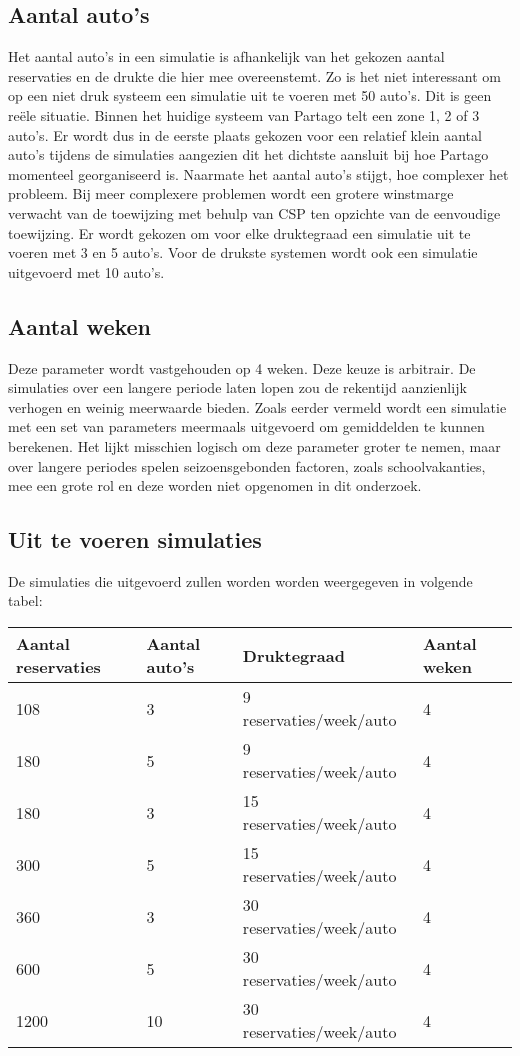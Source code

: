 \subsection{Aantal auto's}
Het aantal auto's in een simulatie is afhankelijk van het gekozen aantal reservaties en de drukte die hier mee overeenstemt. Zo is het niet interessant om op een niet druk systeem een simulatie uit te voeren met 50 auto's. Dit is geen reële situatie. Binnen het huidige systeem van Partago telt een zone 1, 2 of 3 auto's. Er wordt dus in de eerste plaats gekozen voor een relatief klein aantal auto's tijdens de simulaties aangezien dit het dichtste aansluit bij hoe Partago momenteel georganiseerd is. Naarmate het aantal auto's stijgt, hoe complexer het probleem. Bij meer complexere problemen wordt een grotere winstmarge verwacht van de toewijzing met behulp van CSP ten opzichte van de eenvoudige toewijzing. Er wordt gekozen om voor elke druktegraad een simulatie uit te voeren met 3 en 5 auto's. Voor de drukste systemen wordt ook een simulatie uitgevoerd met 10 auto's.
\subsection{Aantal weken}
Deze parameter wordt vastgehouden op 4 weken. Deze keuze is arbitrair. De simulaties over een langere periode laten lopen zou de rekentijd aanzienlijk verhogen en weinig meerwaarde bieden. Zoals eerder vermeld wordt een simulatie met een set van parameters meermaals uitgevoerd om gemiddelden te kunnen berekenen. Het lijkt misschien logisch om deze parameter groter te nemen, maar over langere periodes spelen seizoensgebonden factoren, zoals schoolvakanties, mee een grote rol en deze worden niet opgenomen in dit onderzoek.
\subsection{Uit te voeren simulaties}
De simulaties die uitgevoerd zullen worden worden weergegeven in volgende tabel:
\begin{center}
	\begin{tabular}{ | l | l | l | p{3cm} |}
		\hline
		Aantal reservaties & Aantal auto's & Druktegraad & Aantal weken \\ \hline
		108 & 3 & 9 reservaties/week/auto & 4 \\ \hline
		180 & 5 & 9 reservaties/week/auto & 4 \\ \hline
		180 & 3 & 15 reservaties/week/auto & 4 \\ \hline
		300 & 5 & 15 reservaties/week/auto & 4 \\ \hline
		360 & 3 & 30 reservaties/week/auto & 4 \\ \hline
		600 & 5 & 30 reservaties/week/auto & 4 \\ \hline
		1200 & 10 & 30 reservaties/week/auto & 4 \\ \hline
	\end{tabular}
\end{center} 

